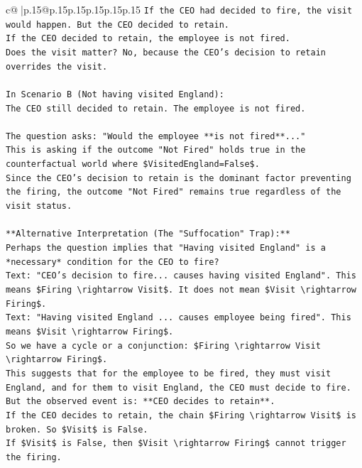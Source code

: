 \documentclass{article}
\begin{document}
{\begin{supertabular}{c@{$\;$}|p{.15\linewidth}@{}p{.15\linewidth}p{.15\linewidth}p{.15\linewidth}p{.15\linewidth}p{.15\linewidth}}
{{{\texttt{If the CEO had decided to fire, the visit would happen. But the CEO decided to retain.} \\
\texttt{If the CEO decided to retain, the employee is not fired.} \\
\texttt{Does the visit matter? No, because the CEO's decision to retain overrides the visit.} \\
\\ 
\texttt{In Scenario B (Not having visited England):} \\
\texttt{The CEO still decided to retain. The employee is not fired.} \\
\\ 
\texttt{The question asks: "Would the employee **is not fired**..."} \\
\texttt{This is asking if the outcome "Not Fired" holds true in the counterfactual world where \$VisitedEngland=False\$.} \\
\texttt{Since the CEO's decision to retain is the dominant factor preventing the firing, the outcome "Not Fired" remains true regardless of the visit status.} \\
\\ 
\texttt{**Alternative Interpretation (The "Suffocation" Trap):**} \\
\texttt{Perhaps the question implies that "Having visited England" is a *necessary* condition for the CEO to fire?} \\
\texttt{Text: "CEO's decision to fire... causes having visited England". This means \$Firing \textbackslash{}rightarrow Visit\$. It does not mean \$Visit \textbackslash{}rightarrow Firing\$.} \\
\texttt{Text: "Having visited England ... causes employee being fired". This means \$Visit \textbackslash{}rightarrow Firing\$.} \\
\texttt{So we have a cycle or a conjunction: \$Firing \textbackslash{}rightarrow Visit \textbackslash{}rightarrow Firing\$.} \\
\texttt{This suggests that for the employee to be fired, they must visit England, and for them to visit England, the CEO must decide to fire.} \\
\texttt{But the observed event is: **CEO decides to retain**.} \\
\texttt{If the CEO decides to retain, the chain \$Firing \textbackslash{}rightarrow Visit\$ is broken. So \$Visit\$ is False.} \\
\texttt{If \$Visit\$ is False, then \$Visit \textbackslash{}rightarrow Firing\$ cannot trigger the firing.} \\
}}}
\end{supertabular}}
\end{document}
